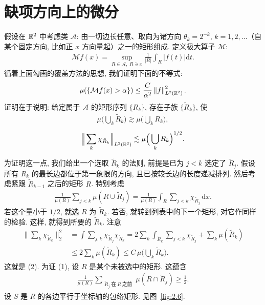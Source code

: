 \section{缺项方向上的微分}

假设在 $\mathbb{R}^2$ 中考虑类 $\mathcal{A}$: 由一切边长任意、取向为诸方向 $\theta_k = 2^{-k}$, $k = 1, 2, \ldots$（自某个固定方向, 比如正 $x$ 方向量起）之一的矩形组成. 定义极大算子 $\mathcal{M}$:
\begin{align*}
  \mathcal{M}f(x)=\sup_{R\in\mathcal{A},\;R\ni x}\frac{1}{\left|R\right|}\int_{R}\left|f(t)\right|\mathrm{d}t.
\end{align*}
循着上面勾画的覆盖方法的思想, 我们证明下面的不等式:
\begin{align*}
  \mu(\{\mathcal{M}f(x)>\alpha\})\leq\frac{C}{\alpha^{2}}\left\|f\right\|_{L^{2}\left(\mathbb{R}^{2}\right)}^{2}.
\end{align*}
证明在于说明: 给定属于 $\mathcal{A}$ 的矩形序列 $\{R_k\}$, 存在子族 $\{\tilde{R}_k\}$, 使
\begin{align*}
  \mu\Big(\bigcup_{k}\tilde{R}_{k}\Big)\gtrsim\mu\Big(\bigcup_{k}R_{k}\Big),
\end{align*}
\begin{align*}
  \Big\|\sum_{k}\chi_{\tilde{R}_{k}}\Big\|_{L^{2}(\mathbb{R}^{2})}\lesssim\mu\Big(\bigcup_{k}R_{k}\Big)^{1/2}.
\end{align*}

为证明这一点, 我们给出一个选取 $\tilde{R}_k$ 的法则, 前提是已为 $j < k$ 选定了 $\tilde{R}_j$. 假设所有 $R_k$ 的最长边都位于第一象限的方向, 且已按较长边的长度递减排列. 然后考虑紧跟 $\tilde{R}_{k-1}$ 之后的矩形 $R$. 特别考虑
\begin{align*}
  \frac{1}{\mu(R)}\sum_{j<k}\mu(R\cup\tilde{R}_{j})=\frac{1}{\mu(R)}\int_{R}\sum_{j<k}\chi_{\tilde{R}_{j}}\,\mathrm{d}x.
\end{align*}
若这个量小于 $1/2$, 就选 $R$ 为 $\tilde{R}_k$. 若否, 就转到列表中的下一个矩形, 对它作同样的检验. 这样, 就得到所要的 $\tilde{R}_k$. 注意
\begin{align*}
  \Big\|\sum_{k}\chi_{\tilde{R}_{k}}\Big\|_{2}^{2}
  &=\int\sum_{j,k}\chi_{\tilde{R}_{j}}\chi_{\tilde{R}_{k}}
  =2\sum_{k}\int_{\tilde{R}_{k}}\sum_{j<k}\chi_{\tilde{R}_{j}}+\sum_{k}\mu(\tilde{R}_{k})\\
  &\leq 2\sum_{k}\mu(\tilde{R}_{k})\leq C\,\mu\Big(\bigcup_{k}\tilde{R}_{k}\Big).
\end{align*}
这就是 (2). 为证 (1), 设 $R$ 是某个未被选中的矩形. 这蕴含
\begin{align*}
  \frac{1}{\mu(R)}\sum_{\substack{\tilde{R}_{j}\ \text{在}\ R\ \text{之前}}}\mu(R\cap\tilde{R}_{j})\geq\frac{1}{2}.
\end{align*}
设 $S$ 是 $R$ 的各边平行于坐标轴的包络矩形. 见图~\ref{fig:2.6}.

